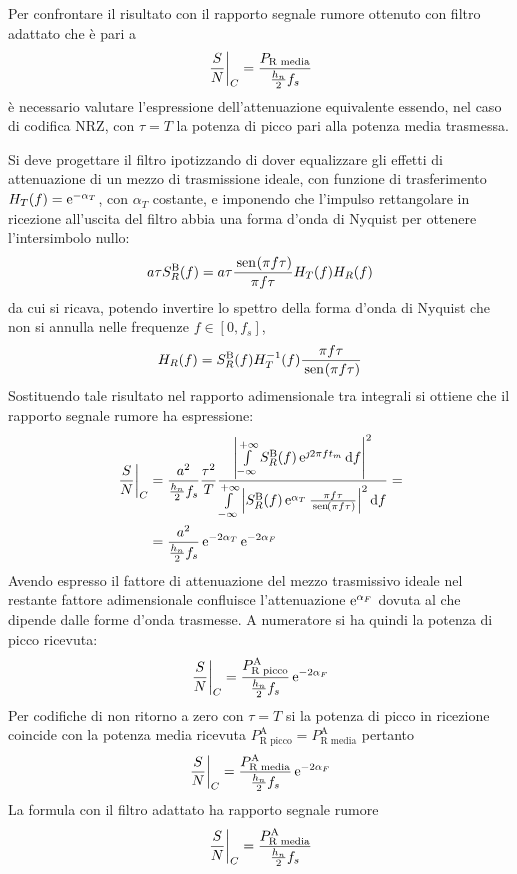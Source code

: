 Per confrontare il risultato con il rapporto segnale rumore ottenuto con filtro adattato che è pari a \[\left.{\frac{S}{N}}\right\rvert_{C}=\frac{P_\text{R media}}{\frac{h_n}{2}f_s}\]
è necessario valutare l'espressione dell'attenuazione equivalente essendo, nel caso di codifica \ac{NRZ}, con $\tau=T$ la potenza di picco pari alla potenza media trasmessa. 

Si deve progettare il filtro ipotizzando di dover equalizzare gli effetti di attenuazione di un mezzo di trasmissione ideale, con funzione di trasferimento $H_T(f)=\operatorname{e}^{-\alpha_T}$, con $\alpha_T$ costante, e imponendo che l'impulso rettangolare in ricezione all'uscita del filtro abbia una forma d'onda di Nyquist per ottenere l'intersimbolo nullo:
\begin{equation}
a\tau S_R^\text{B}(f)=a\tau\frac{\,{\operatorname{sen}}^{}\!\left({\pi f\tau}\right)}{\pi f\tau} H_T(f) H_R(f)
\end{equation}
da cui si ricava, potendo invertire lo spettro della forma d'onda di Nyquist che non si annulla nelle frequenze $f\in[0,f_s]$,
\begin{equation}
H_R(f)=S_R^\text{B}(f) H_T^{-1}(f) \frac{\pi f\tau}{\,{\operatorname{sen}}^{}\!\left({\pi f\tau}\right)}
\end{equation}
Sostituendo tale risultato nel rapporto adimensionale tra integrali si ottiene che il rapporto segnale rumore ha espressione:
\begin{equation}
\begin{split}
\left.{\frac{S}{N}}\right\rvert_{C}&=\frac{a^2}{\frac{h_n}{2}f_s} \frac{\tau^2}{T}\frac{\left|{\int\limits_{-\infty}^{+\infty}{S_R^\text{B}(f)\operatorname{e}^{\jmath 2\pi f t_m}}{\,\mathop{}\!\mathrm{d}{f}}}\right|^2}{\int\limits_{-\infty}^{+\infty}{\left|{S_R^\text{B}(f) \operatorname{e}^{\alpha_T}\frac{\pi f\tau}{\,{\operatorname{sen}}^{}\!\left({\pi f\tau}\right)}}\right|^2}{\,\mathop{}\!\mathrm{d}{f}}}=\\
&=\frac{a^2}{\frac{h_n}{2}f_s}\operatorname{e}^{-2\alpha_T}\operatorname{e}^{-2\alpha_F}
\end{split}
\end{equation}
Avendo espresso il fattore di attenuazione del mezzo trasmissivo ideale nel restante fattore adimensionale confluisce l'attenuazione $\operatorname{e}^{\alpha_F}$ dovuta al  che dipende dalle forme d'onda trasmesse. A numeratore si ha quindi la potenza di picco ricevuta:
\begin{equation}
\left.{\frac{S}{N}}\right\rvert_{C}=\frac{P_\text{R picco}^\text{A}}{\frac{h_n}{2}f_s}\operatorname{e}^{-2\alpha_F}
\end{equation}
Per codifiche di non ritorno a zero con $\tau=T$ si la potenza di picco in ricezione coincide con la potenza media ricevuta $P_\text{R picco}^\text{A}=P_\text{R media}^\text{A}$ pertanto
\begin{equation}
\left.{\frac{S}{N}}\right\rvert_{C}=\frac{P_\text{R media}^\text{A}}{\frac{h_n}{2}f_s}\operatorname{e}^{-2\alpha_F}
\end{equation}
La formula con il filtro adattato ha rapporto segnale rumore 
\begin{equation}
\left.{\frac{S}{N}}\right\rvert_{C}=\frac{P_\text{R media}^\text{A}}{\frac{h_n}{2}f_s}
\end{equation}

